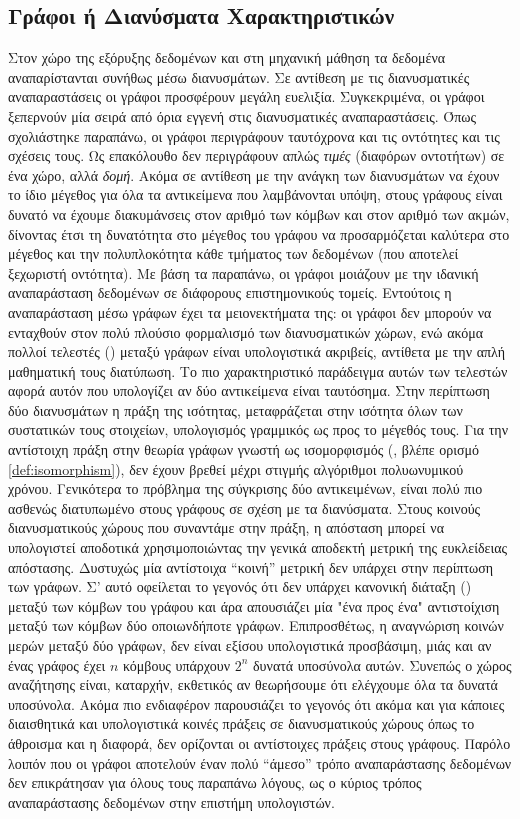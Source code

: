 \subsection{Γράφοι ή Διανύσματα Χαρακτηριστικών}
Στον χώρο της εξόρυξης δεδομένων και στη μηχανική μάθηση τα δεδομένα αναπαρίστανται συνήθως μέσω διανυσμάτων.
Σε αντίθεση με τις διανυσματικές αναπαραστάσεις οι γράφοι προσφέρουν μεγάλη ευελιξία.
Συγκεκριμένα, οι γράφοι ξεπερνούν μία σειρά από όρια εγγενή στις διανυσματικές αναπαραστάσεις.
Όπως σχολιάστηκε παραπάνω, οι γράφοι περιγράφουν ταυτόχρονα και τις οντότητες και τις σχέσεις τους.
Ως επακόλουθο δεν περιγράφουν απλώς \textit{τιμές} (διαφόρων οντοτήτων) σε ένα χώρο, αλλά \textit{δομή}.
Ακόμα σε αντίθεση με την ανάγκη των διανυσμάτων να έχουν το ίδιο μέγεθος για όλα τα αντικείμενα που λαμβάνονται υπόψη, στους γράφους είναι δυνατό να έχουμε διακυμάνσεις στον αριθμό των κόμβων και στον αριθμό των ακμών, δίνοντας έτσι τη δυνατότητα στο μέγεθος του γράφου να προσαρμόζεται καλύτερα στο μέγεθος και την πολυπλοκότητα κάθε τμήματος των δεδομένων (που αποτελεί ξεχωριστή οντότητα).
Με βάση τα παραπάνω, οι γράφοι μοιάζουν με την ιδανική αναπαράσταση δεδομένων σε διάφορους επιστημονικούς τομείς.
Εντούτοις η αναπαράσταση μέσω γράφων έχει τα μειονεκτήματα της: οι γράφοι δεν μπορούν να ενταχθούν στον πολύ πλούσιο φορμαλισμό των διανυσματικών χώρων, ενώ ακόμα πολλοί τελεστές () μεταξύ γράφων είναι υπολογιστικά ακριβείς, αντίθετα με την απλή μαθηματική τους διατύπωση.
Το πιο χαρακτηριστικό παράδειγμα αυτών των τελεστών αφορά αυτόν που υπολογίζει αν δύο αντικείμενα είναι ταυτόσημα.
Στην περίπτωση δύο διανυσμάτων η πράξη της ισότητας, μεταφράζεται στην ισότητα όλων των συστατικών τους στοιχείων, υπολογισμός γραμμικός ως προς το μέγεθός τους.
Για την αντίστοιχη πράξη στην θεωρία γράφων γνωστή ως ισομορφισμός (, βλέπε ορισμό \ref{def:isomorphism}), δεν έχουν βρεθεί μέχρι στιγμής αλγόριθμοι πολυωνυμικού χρόνου.
Γενικότερα το πρόβλημα της σύγκρισης δύο αντικειμένων, είναι πολύ πιο ασθενώς διατυπωμένο στους γράφους σε σχέση με τα διανύσματα.
Στους κοινούς διανυσματικούς χώρους που συναντάμε στην πράξη, η απόσταση μπορεί να υπολογιστεί αποδοτικά χρησιμοποιώντας την γενικά αποδεκτή μετρική της ευκλείδειας απόστασης.
Δυστυχώς μία αντίστοιχα ``κοινή'' μετρική δεν υπάρχει στην περίπτωση των γράφων.
Σ' αυτό οφείλεται το γεγονός ότι δεν υπάρχει κανονική διάταξη () μεταξύ των κόμβων του γράφου και άρα απουσιάζει μία "ένα προς ένα" αντιστοίχιση μεταξύ των κόμβων δύο οποιωνδήποτε γράφων.
Επιπροσθέτως, η αναγνώριση κοινών μερών μεταξύ δύο γράφων, δεν είναι εξίσου υπολογιστικά προσβάσιμη, μιάς και αν ένας γράφος έχει $n$ κόμβους υπάρχουν $2^{n}$ δυνατά υποσύνολα αυτών.
Συνεπώς ο χώρος αναζήτησης είναι, καταρχήν, εκθετικός αν θεωρήσουμε ότι ελέγχουμε όλα τα δυνατά υποσύνολα.
Ακόμα πιο ενδιαφέρον παρουσιάζει το γεγονός ότι ακόμα και για κάποιες διαισθητικά και υπολογιστικά κοινές πράξεις σε διανυσματικούς χώρους όπως το άθροισμα και η διαφορά, δεν ορίζονται οι αντίστοιχες πράξεις στους γράφους.
Παρόλο λοιπόν που οι γράφοι αποτελούν έναν πολύ ``άμεσο'' τρόπο αναπαράστασης δεδομένων δεν επικράτησαν για όλους τους παραπάνω λόγους, ως ο κύριος τρόπος αναπαράστασης δεδομένων στην επιστήμη υπολογιστών.
